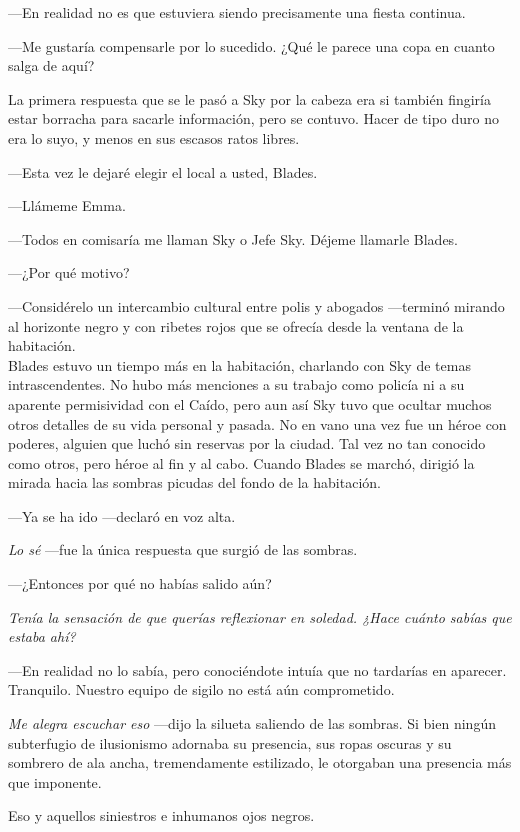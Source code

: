 ---En realidad no es que estuviera siendo precisamente una fiesta continua.

---Me gustaría compensarle por lo sucedido. ¿Qué le parece una copa en cuanto salga de aquí?

La primera respuesta que se le pasó a Sky por la cabeza era si también fingiría estar borracha para sacarle información, pero se contuvo. Hacer de tipo duro no era lo suyo, y menos en sus escasos ratos libres.

---Esta vez le dejaré elegir el local a usted, Blades.

---Llámeme Emma.

---Todos en comisaría me llaman Sky o Jefe Sky. Déjeme llamarle Blades.

---¿Por qué motivo?

---Considérelo un intercambio cultural entre polis y abogados ---terminó mirando al horizonte negro y con ribetes rojos que se ofrecía desde la ventana de la habitación.\\

\noindent{}Blades estuvo un tiempo más en la habitación, charlando con Sky de temas intrascendentes. No hubo más menciones a su trabajo como policía ni a su aparente permisividad con el Caído, pero aun así Sky tuvo que ocultar muchos otros detalles de su vida personal y pasada. No en vano una vez fue un héroe con poderes, alguien que luchó sin reservas por la ciudad. Tal vez no tan conocido como otros, pero héroe al fin y al cabo.
Cuando Blades se marchó, dirigió la mirada hacia las sombras picudas del fondo de la habitación.

---Ya se ha ido ---declaró en voz alta.

\emph{Lo sé} ---fue la única respuesta que surgió de las sombras.

---¿Entonces por qué no habías salido aún?

\emph{Tenía la sensación de que querías reflexionar en soledad. ¿Hace cuánto sabías que estaba ahí?}

---En realidad no lo sabía, pero conociéndote intuía que no tardarías en aparecer. Tranquilo. Nuestro equipo de sigilo no está aún comprometido.

\emph{Me alegra escuchar eso} ---dijo la silueta saliendo de las sombras. Si bien ningún subterfugio de ilusionismo adornaba su presencia, sus ropas oscuras y su sombrero de ala ancha, tremendamente estilizado, le otorgaban una presencia más que imponente.

Eso y aquellos siniestros e inhumanos ojos negros.

